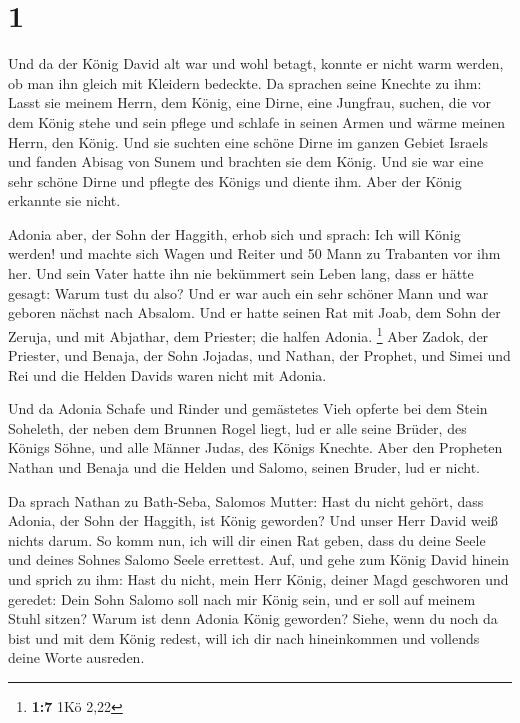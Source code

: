 \hypertarget{section}{%
\section{1}\label{section}}

 Und da der König David alt war und wohl betagt, konnte er
nicht warm werden, ob man ihn gleich mit Kleidern bedeckte. 
Da sprachen seine Knechte zu ihm: Lasst sie meinem Herrn, dem König,
eine Dirne, eine Jungfrau, suchen, die vor dem König stehe und sein
pflege und schlafe in seinen Armen und wärme meinen Herrn, den König.
 Und sie suchten eine schöne Dirne im ganzen Gebiet Israels
und fanden Abisag von Sunem und brachten sie dem König.  Und
sie war eine sehr schöne Dirne und pflegte des Königs und diente ihm.
Aber der König erkannte sie nicht.

 Adonia aber, der Sohn der Haggith, erhob sich und sprach:
Ich will König werden! und machte sich Wagen und Reiter und 50 Mann zu
Trabanten vor ihm her.  Und sein Vater hatte ihn nie
bekümmert sein Leben lang, dass er hätte gesagt: Warum tust du also? Und
er war auch ein sehr schöner Mann und war geboren nächst nach Absalom.
 Und er hatte seinen Rat mit Joab, dem Sohn der Zeruja, und
mit Abjathar, dem Priester; die halfen Adonia. \footnote{\textbf{1:7}
  1Kö 2,22}  Aber Zadok, der Priester, und Benaja, der Sohn
Jojadas, und Nathan, der Prophet, und Simei und Rei und die Helden
Davids waren nicht mit Adonia.

 Und da Adonia Schafe und Rinder und gemästetes Vieh opferte
bei dem Stein Soheleth, der neben dem Brunnen Rogel liegt, lud er alle
seine Brüder, des Königs Söhne, und alle Männer Judas, des Königs
Knechte.  Aber den Propheten Nathan und Benaja und die
Helden und Salomo, seinen Bruder, lud er nicht.

 Da sprach Nathan zu Bath-Seba, Salomos Mutter: Hast du
nicht gehört, dass Adonia, der Sohn der Haggith, ist König geworden? Und
unser Herr David weiß nichts darum.  So komm nun, ich will
dir einen Rat geben, dass du deine Seele und deines Sohnes Salomo Seele
errettest.  Auf, und gehe zum König David hinein und sprich
zu ihm: Hast du nicht, mein Herr König, deiner Magd geschworen und
geredet: Dein Sohn Salomo soll nach mir König sein, und er soll auf
meinem Stuhl sitzen? Warum ist denn Adonia König geworden? 
Siehe, wenn du noch da bist und mit dem König redest, will ich dir nach
hineinkommen und vollends deine Worte ausreden.

